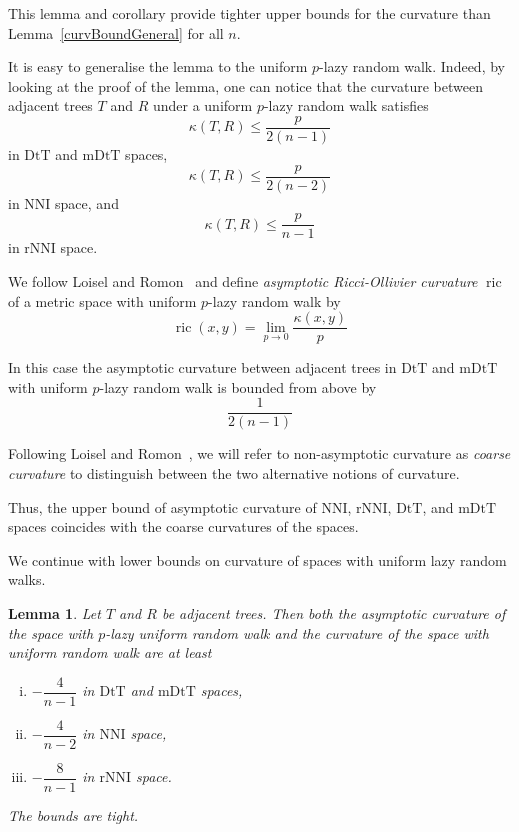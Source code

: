 \documentclass{amsart}
\newtheorem{lemma}{Lemma}
\newcommand{\dts}{\mathrm{DtT}}
\newcommand{\nni}{\mathrm{NNI}}
\newcommand{\rnni}{\mathrm{rNNI}}
\newcommand{\mdts}{\mathrm{mDtT}}
\newcommand{\ric}{\operatorname{ric}}
\begin{document}
This lemma and corollary provide tighter upper bounds for the curvature than Lemma~\ref{curvBoundGeneral} for all $n$.

It is easy to generalise the lemma to the uniform $p$-lazy random walk.
Indeed, by looking at the proof of the lemma, one can notice that the curvature between adjacent trees $T$ and $R$ under a uniform $p$-lazy random walk satisfies
\[
\kappa(T,R) \leq \frac{p}{2(n-1)}
\]
in $\dts$ and $\mdts$ spaces,
\[
\kappa(T,R) \leq \frac{p}{2(n-2)}
\]
in $\nni$ space, and
\[
\kappa(T,R) \leq \frac{p}{n-1}
\]
in $\rnni$ space.


We follow Loisel and Romon~\cite{Loisel2014-gu} and define {\em asymptotic Ricci-Ollivier curvature} $\ric$ of a metric space with uniform $p$-lazy random walk by 
\[
\ric(x,y) = \lim_{p\to0} \frac{\kappa(x,y)}{p}
\]

In this case the asymptotic curvature between adjacent trees in $\dts$ and $\mdts$ with uniform $p$-lazy random walk is bounded from above by
\[
\frac{1}{2(n-1)}
\]

Following Loisel and Romon~\cite{Loisel2014-gu}, we will refer to non-asymptotic curvature as {\em coarse curvature}  to distinguish between the two alternative notions of curvature.


Thus, the upper bound of asymptotic curvature of $\nni$, $\rnni$, $\dts$, and $\mdts$ spaces coincides with the coarse curvatures of the spaces.

We continue with lower bounds on curvature of spaces with uniform lazy random walks.

\begin{lemma}\label{uniformLower}
Let $T$ and $R$ be adjacent trees.
Then both the asymptotic curvature of the space with $p$-lazy uniform random walk and the curvature of the space with uniform random walk are at least 
\begin{enumerate}[(i)]
\item $-\dfrac{4}{n-1}$ in $\dts$ and $\mdts$ spaces,
\item $-\dfrac{4}{n-2}$ in $\nni$ space,
\item $-\dfrac{8}{n-1}$ in $\rnni$ space. 
\end{enumerate}

The bounds are tight.
\end{lemma}
\end{document}
